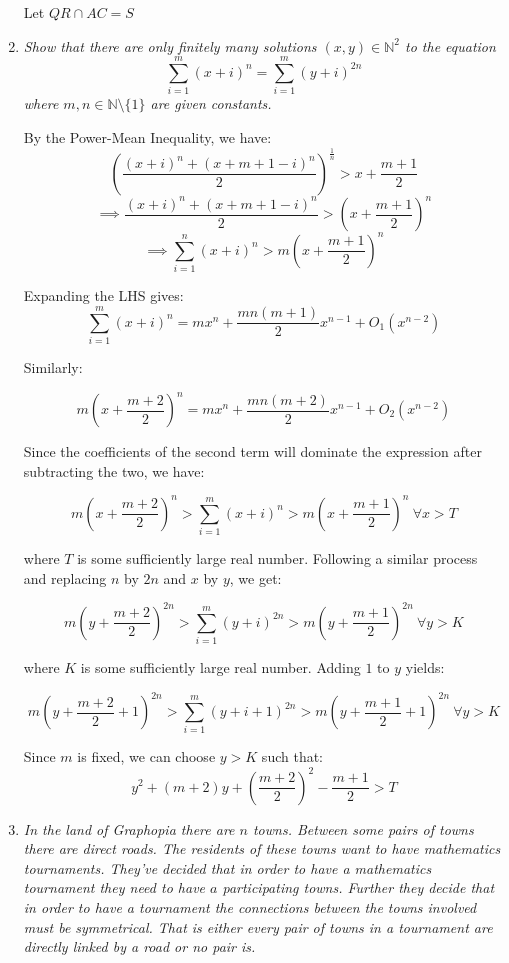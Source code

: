 \documentclass{article}
\begin{document}
\begin{enumerate}
Let $QR \cap AC = S$



\medskip
\item %
{\itshape Show that there are only finitely many solutions $(x, y) \in \mathbb{N}^2$ to the equation
$$\sum_{i = 1}^{m} (x + i)^n = \sum_{i = 1}^{m} (y + i)^{2n}$$
where $m, n \in \mathbb{N} \setminus \{1\}$ are given constants.}

By the Power-Mean Inequality, we have:
$$(\frac{(x + i)^n + (x + m + 1 - i)^n}{2})^{\frac{1}{n}} > x + \frac{m + 1}{2}$$
$$\implies \frac{(x + i)^n + (x + m + 1 - i)^n}{2} > (x + \frac{m + 1}{2})^n$$
$$\implies \sum_{i = 1}^{n} (x + i)^n > m(x + \frac{m + 1}{2})^n$$

Expanding the LHS gives:
$$\sum_{i = 1}^{m} (x + i)^n = mx^n + \frac{mn(m + 1)}{2}x^{n - 1} + O_1(x^{n - 2})$$

Similarly:

$$m(x + \frac{m + 2}{2})^n = mx^n + \frac{mn(m + 2)}{2}x^{n - 1} + O_2(x^{n - 2})$$

Since the coefficients of the second term will dominate the expression after subtracting the two, we have:

$$m(x + \frac{m + 2}{2})^n > \sum_{i = 1}^{m} (x + i)^n > m(x + \frac{m + 1}{2})^n ~\forall x > T$$

where $T$ is some sufficiently large real number. Following a similar process and replacing $n$ by $2n$ and $x$ by $y$, we get:

$$m(y + \frac{m + 2}{2})^{2n} > \sum_{i = 1}^{m} (y + i)^{2n} > m(y + \frac{m + 1}{2})^{2n} ~\forall y > K$$

where $K$ is some sufficiently large real number. Adding $1$ to $y$ yields:

$$m(y + \frac{m + 2}{2} + 1)^{2n} > \sum_{i = 1}^{m} (y + i + 1)^{2n} > m(y + \frac{m + 1}{2} + 1)^{2n} ~\forall y > K$$

Since $m$ is fixed, we can choose $y > K$ such that: 
$$y^2 + (m + 2)y + (\frac{m + 2}{2})^2 - \frac{m + 1}{2} > T$$

\medskip
\item %
{\itshape In the land of Graphopia there are $n$ towns. Between some pairs of towns there are direct roads. The residents of these towns want to have mathematics tournaments. They've decided that in order to have a mathematics tournament they need to have $a$ participating towns. Further they decide that in order to have a tournament the connections between the towns involved must be symmetrical. That is either every pair of towns in a tournament are directly linked by a road or no pair is. 

}
\end{enumerate}
\end{document}

